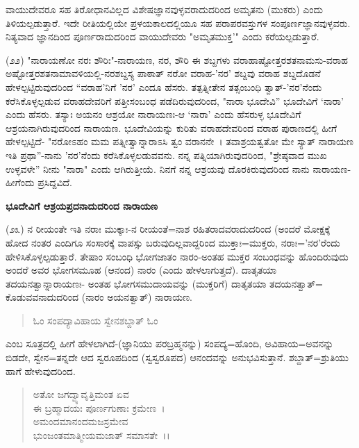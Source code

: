 
\noindent
ವಾಯುದೇವರೂ ಸಹ ತಿರೋಧಾನವಿಲ್ಲದ ವಿಶೇಷಜ್ಞಾನವುಳ್ಳವರಾದುದರಿಂದ ಅಮೃತನು (ಮುಕರು) ಎಂದು ತಿಳಿಯಲ್ಪಡುತ್ತಾರೆ. ಇದೇ ರೀತಿಯಲ್ಲಿಯೇ ಪ್ರಳಯಕಾಲದಲ್ಲಿಯೂ ಸಹ ಪರಾಪರವಸ್ತುಗಳ ಸಂಪೂರ್ಣಜ್ಞಾನವುಳ್ಳವರು. ನಿತ್ಯವಾದ ಜ್ಞಾನದಿಂದ ಪೂರ್ಣರಾದುದರಿಂದ ವಾಯುದೇವರು "ಅಮೃತಮುಕ್ತ'" ಎಂದು ಕರೆಯಲ್ಪಡುತ್ತಾರೆ.

(೨೨) "ನಾರಾಯಣೋ ನರಃ ಶೌರಿಃ"-ನಾರಾಯಣ, ನರ, ಶೌರಿ ಈ ಶಬ್ದಗಳು ವರಾಹಾಷ್ಟೋತ್ತರಶತನಾಮಸು-ವರಾಹ ಅಷ್ಟೋತ್ತರಶತನಾಮಾವಳಿಯಲ್ಲಿ-ನರಶಬ್ದಸ್ಯ ಪಾಠಾತ್ ನರೋ ವರಾಹ-'ನರ' ಶಬ್ದವು ವರಾಹ ಶಬ್ದದೊಡನೆ ಹೇಳಲ್ಪಟ್ಟಿರುವುದರಿಂದ “ವರಾಹ'ನಿಗೆ 'ನರ' ಎಂದೂ ಹೆಸರು. ತತ್ಪತ್ನೀತೇನ ತತ್ಸಂಬಂಧಿ ತ್ವಾತ್-'ನರ'ನೆಂದು ಕರೆಸಿಕೊಳ್ಳಲ್ಪಡುವ ವರಾಹದೇವರಿಗೆ ಪತ್ತೀಸಂಬಂಧ ಪಡೆದಿರುವುದರಿಂದ, "ನಾರಾ ಭೂದೇವಿ'' ಭೂದೇವಿಗೆ `ನಾರಾ' ಎಂದು ಹೆಸರು. ತಸ್ಯಾಃ ಅಯನಂ ಆಶ್ರಯೋ ನಾರಾಯಣಃ-ಆ `ನಾರಾ' ಎಂದು ಹೆಸರುಳ್ಳ ಭೂದೇವಿಗೆ ಆಶ್ರಯನಾಗಿರುವುದರಿಂದ ನಾರಾಯಣ. ಭೂದೇವಿಯನ್ನು ಕುರಿತು ವರಾಹದೇವರಿಂದ ವರಾಹ ಪುರಾಣದಲ್ಲಿ ಹೀಗೆ ಹೇಳಲ್ಪಟ್ಟಿದೆ- "ನರೋಽಹಂ ಮಮ ಪತ್ನೀತ್ವಾನ್ನಾರಾಽಸಿ ತ್ವಂ ವರಾನನೇ~। ತವಾಶ್ರಯತ್ವತೋ ಮೇ ಸ್ಯಾತ್ ನಾರಾಯಣ ಇತಿ ಪ್ರಥಾ''-ನಾನು 'ನರ'ನೆಂದು ಕರೆಸಿಕೊಳ್ಳಲಡುವವನು. ನನ್ನ ಪತ್ನಿಯಾಗಿರುವುದರಿಂದ, "ಶ್ರೇಷ್ಠವಾದ ಮುಖ ಉಳ್ಳವಳೇ'' ನೀನು "ನಾರಾ" ಎಂದು ಆಗಿರುತ್ತೀಯೆ. ನಿನಗೆ ನನ್ನ ಆಶ್ರಯವು ದೊರಕಿರುವುದರಿಂದ ನಾನು ನಾರಾಯಣ- ಹೀಗೆಂದು ಪ್ರಸಿದ್ದವಿದೆ.

\begin{center}
\textbf{ಭೂದೇವಿಗೆ ಆಶ್ರಯಪ್ರದನಾದುದರಿಂದ ನಾರಾಯಣ}
\end{center}

(೨೩) ನ ರೀಯಂತೇ ಇತಿ ನರಾಃ ಮುಕ್ಕಾಃ-ನ ರೀಯಂತೆ=ನಾಶ ರಹಿತರಾದವರಾದುದರಿಂದ (ಅಂದರೆ ಮೋಕ್ಷಕ್ಕೆ ಹೋದ ನಂತರ ಎಂದಿಗೂ ಸಂಸಾರಕ್ಕೆ ವಾಪಸ್ಸು ಬರುವುದಿಲ್ಲವಾದ್ದರಿಂದ ಮುಕ್ತಾಃ=ಮುಕ್ತರು, ನರಾಃ='ನರ'ರೆಂದು ಹೇಳಿಸಿಕೊಳ್ಳಲ್ಪಡುತ್ತಾರೆ. ತೇಷಾಂ ಸಂಬಂಧಿ ಭೋಗಜಾತಂ ನಾರಂ-ಅಂತಹ ಮುಕ್ತರ ಸಂಬಂಧವನ್ನು ಹೊಂದಿರುವುದು ಅಂದರೆ ಅವರ ಭೋಗಸಮೂಹ (ಆನಂದ) ನಾರಂ (ಎಂದು ಹೇಳಲಾಗುತ್ತದೆ). ದಾತೃತಯಾ ತದಯನತ್ವಾನ್ನಾರಾಯಣಃ- ಅಂತಹ ಭೋಗಸಮುದಾಯವನ್ನು (ಮುಕ್ತರಿಗೆ) ದಾತೃತಯಾ ತದಯನತ್ವಾತ್= ಕೊಡುವವನಾದುದರಿಂದ (ನಾರಂ ಅಯನತ್ವಾತ್) ನಾರಾಯಣ.

\begin{verse}
ಓಂ ಸಂಪದ್ಯಾವಿಹಾಯ ಸ್ವೇನಶಬ್ದಾತ್ ಓಂ
\end{verse}


\noindent
ಎಂಬ ಸೂತ್ರದಲ್ಲಿ ಹೀಗೆ ಹೇಳಲಾಗಿದೆ-(ಜ್ಞಾನಿಯು ಪರಬ್ರಹ್ಮನನ್ನು) ಸಂಪದ್ಯ=ಹೊಂದಿ, ಅವಿಹಾಯ=ಅವನನ್ನು ಬಿಡದೇ, ಸ್ವೇನ=ತನ್ನದೇ ಆದ ಸ್ವರೂಪದಿಂದ (ಸ್ವಸ್ವರೂಪದ) ಆನಂದವನ್ನು ಅನುಭವಿಸುತ್ತಾನೆ. ಶಬ್ದಾತ್=ಶ್ರುತಿಯು ಹಾಗೆ ಹೇಳುವುದರಿಂದ.

\begin{verse}
ಅತೋ ಜಗದ್ವ್ಯಾವೃತ್ತಿಮಂತ ಏವ\\ ಈ ಬ್ರಹ್ಮಾದಯಃ ಪೂರ್ಣಗುಣಾಃ ಕ್ರಮೇಣ~।\\ ಅಮಂದಮಾನಂದಮಜಸ್ರಮೇವ\\ ಭುಂಜಂತಮಾತ್ಮೀಯಮಜಾತ್ ಸಮಾಸತೇ~।।
\end{verse}

